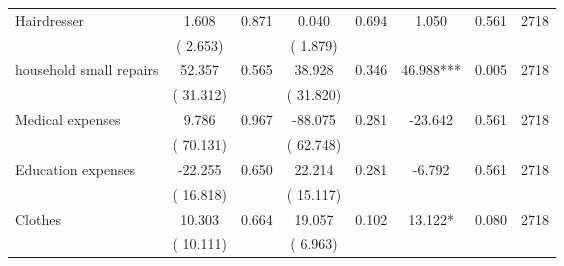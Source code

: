 \begin{tabular}{l*{7}{c}}
 Hairdresser       &              1.608       &        0.871  &              0.040       &        0.694  &              1.050       &              0.561 &  2718 \\ 
                       &       (       2.653)             &                               &       (       1.879)                     &                               &                                               &                                &                      \\ 

 household small repairs       &             52.357       &        0.565  &             38.928       &        0.346  &             46.988***       &              0.005 &  2718 \\ 
                       &       (      31.312)             &                               &       (      31.820)                     &                               &                                               &                                &                      \\ 

 Medical expenses       &              9.786       &        0.967  &            -88.075       &        0.281  &            -23.642       &              0.561 &  2718 \\ 
                       &       (      70.131)             &                               &       (      62.748)                     &                               &                                               &                                &                      \\ 

 Education expenses       &            -22.255       &        0.650  &             22.214       &        0.281  &             -6.792       &              0.561 &  2718 \\ 
                       &       (      16.818)             &                               &       (      15.117)                     &                               &                                               &                                &                      \\ 

 Clothes       &             10.303       &        0.664  &             19.057       &        0.102  &             13.122*       &              0.080 &  2718 \\ 
                       &       (      10.111)             &                               &       (       6.963)                     &                               &                                               &                                &                      \\ 


\end{tabular}
